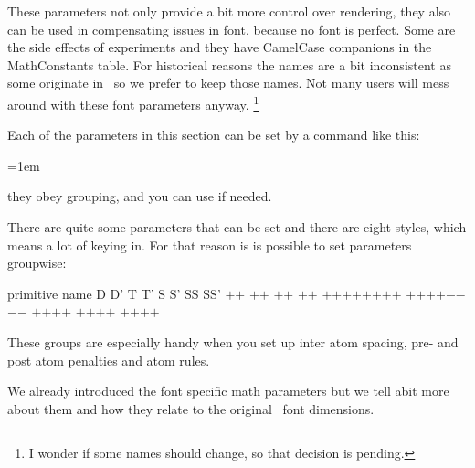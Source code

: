 These parameters not only provide a bit more control over rendering, they also
can be used in compensating issues in font, because no font is perfect. Some are
the side effects of experiments and they have CamelCase companions in the \type
{MathConstants} table. For historical reasons the names are a bit inconsistent as
some originate in \TEX\ so we prefer to keep those names. Not many users will
mess around with these font parameters anyway. \footnote {I wonder if some names
should change, so that decision is pending.}

Each of the parameters in this section can be set by a command like this:

\starttyping
\Umathquad\displaystyle=1em
\stoptyping

they obey grouping, and you can use \type {\the\Umathquad\displaystyle} if
needed.

There are quite some parameters that can be set and there are eight styles, which means a lot
of keying in. For that reason is is possible to set parameters groupwise:

\starttabulate[|l|c|c|c|c|c|c|c|c|]
\FL
\BC primitive name               \BC D \BC D' \BC T \BC T' \BC S \BC S' \BC SS \BC SS' \NC \NR
\TL
\NC \type {\alldisplaystyles}      \NC$+$\NC$+ $\NC   \NC    \NC   \NC    \NC    \NC     \NC \NR
\NC \type {\alltextstyles}         \NC   \NC    \NC$+$\NC$+ $\NC   \NC    \NC    \NC     \NC \NR
\NC \type {\allscriptstyles}       \NC   \NC    \NC   \NC    \NC$+$\NC$+ $\NC    \NC     \NC \NR
\NC \type {\allscriptscriptstyles} \NC   \NC    \NC   \NC    \NC   \NC    \NC$+ $\NC$+  $\NC \NR
\NC \type {\allmathstyles}         \NC$+$\NC$+ $\NC$+$\NC$+ $\NC$+$\NC$+ $\NC$+ $\NC$+  $\NC \NR
\NC \type {\allmainstyles}         \NC   \NC    \NC   \NC    \NC   \NC    \NC    \NC     \NC \NR
\NC \type {\allsplitstyles}        \NC$+$\NC$+ $\NC$+$\NC$+ $\NC$-$\NC$- $\NC$- $\NC$-  $\NC \NR
\NC \type {\allunsplitstyles}      \NC   \NC    \NC   \NC    \NC$+$\NC$+ $\NC$+ $\NC$+  $\NC \NR
\NC \type {\alluncrampedstyles}    \NC$+$\NC    \NC$+$\NC    \NC$+$\NC    \NC$+ $\NC     \NC \NR
\NC \type {\allcrampedstyles}      \NC   \NC$+ $\NC   \NC$+ $\NC   \NC$+ $\NC    \NC$+  $\NC \NR
\LL
\stoptabulate

These groups are especially handy when you set up inter atom spacing, pre- and
post atom penalties and atom rules.

We already introduced the font specific math parameters but we tell abit more
about them and how they relate to the original \TEX\ font dimensions.

